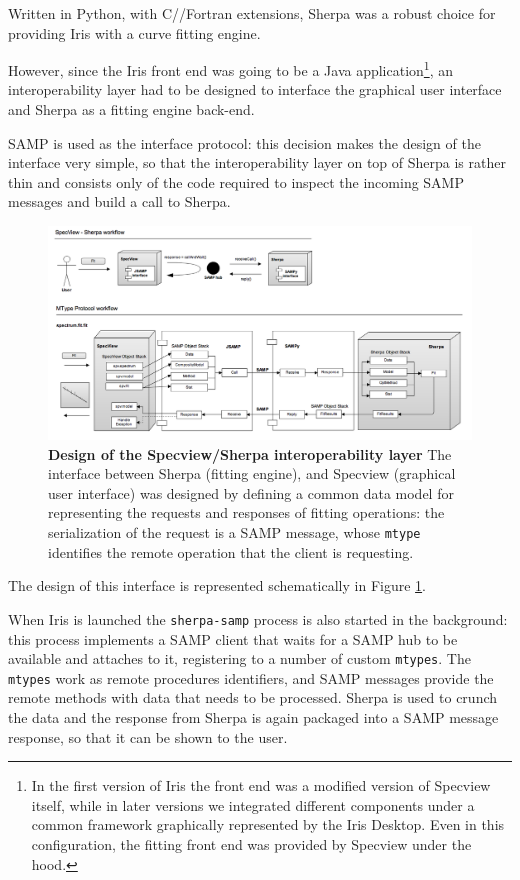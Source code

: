 \documentclass[final,5p,authoryear]{elsarticle}
\begin{document}
Written in Python, with C/\Cpp/Fortran extensions, Sherpa was a robust choice
for providing Iris with a curve fitting engine.

However, since the Iris front end was going to be a Java application\footnote{In
the first version of Iris the front end was a modified version of Specview
itself, while in later versions we integrated different components under a
common framework graphically represented by the Iris Desktop. Even in this
configuration, the fitting front end was provided by Specview under the hood.},
an interoperability layer had to be designed to interface the graphical user
interface and Sherpa as a fitting engine back-end.

SAMP is used as the interface protocol: this decision makes the design of the
interface very simple, so that the interoperability layer on top of Sherpa is
rather thin and consists only of the code required to inspect the incoming SAMP
messages and build a call to Sherpa.

\begin{figure} \begin{center}
\includegraphics[width=\textwidth]{figures/sherpasamp.png}
\caption{\textbf{Design of the Specview/Sherpa interoperability layer} The
interface between Sherpa (fitting engine), and Specview (graphical user
interface) was designed by defining a common data model for representing the
requests and responses of fitting operations: the serialization of the request
is a SAMP message, whose \texttt{mtype} identifies the remote operation that the
client is requesting.} \label{fig:sherpasamp} \end{center} \end{figure}

The design of this interface is represented schematically in Figure
\ref{fig:sherpasamp}.

When Iris is launched the \verb|sherpa-samp| process is also started in the
background: this process implements a SAMP client that waits for a SAMP hub to
be available and attaches to it, registering to a number of custom
\verb|mtypes|. The \verb|mtypes| work as remote procedures identifiers, and SAMP
messages provide the remote methods with data that needs to be processed. Sherpa
is used to crunch the data and the response from Sherpa is again packaged into a
SAMP message response, so that it can be shown to the user.
\end{document}
